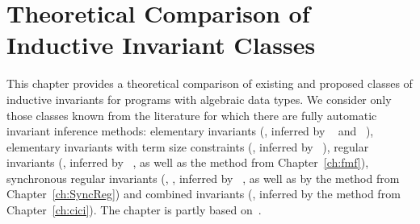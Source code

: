 \chapter{Theoretical Comparison of Inductive Invariant Classes}\label{ch:comparison}

This chapter provides a theoretical comparison of existing and proposed classes of inductive invariants for programs with algebraic data types.
We consider only those classes known from the literature for which there are fully automatic invariant inference methods: elementary invariants (\elemclass{}, inferred by \spacer{}~\cite{komuravelli2016smt} and \hoice{}~\cite{10.1007/978-3-030-02768-1_8}), elementary invariants with term size constraints (\sizeelemclass{}, inferred by \eldarica{}~\cite{8603013}), regular invariants (\regclass{}, inferred by \rchc{}~\cite{haude2020}, as well as the method from Chapter~\cref{ch:fmf}), synchronous regular invariants (\syncRegFlatClass{}, \syncRegFullClass{}, inferred by \rchc{}~\cite{haude2020}, as well as by the method from Chapter~\cref{ch:SyncReg}) and combined invariants (\regelemclass{}, inferred by the method from Chapter~\cref{ch:cici}).
The chapter is partly based on~\cite{10.1145/3453483.3454055}.

